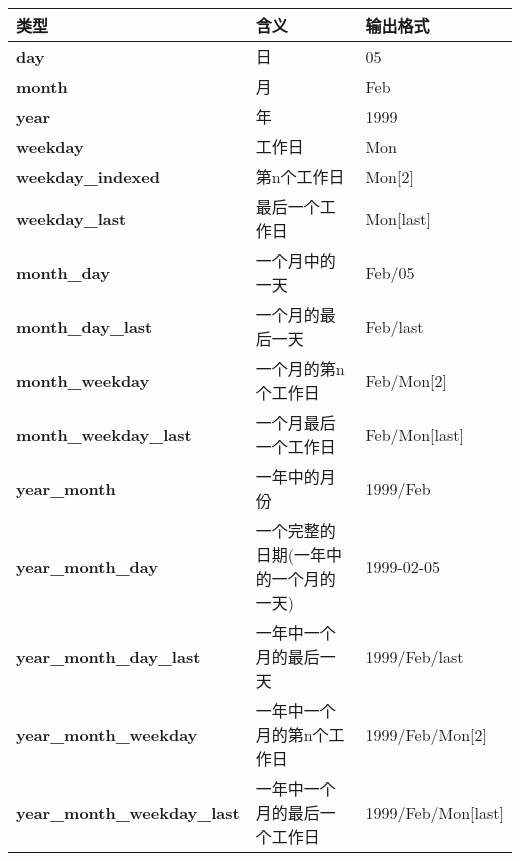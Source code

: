 \begin{longtable}[c]{|l|l|l|}
\hline
\textbf{类型}                   & \textbf{含义}                       & \textbf{输出格式} \\ \hline
\endfirsthead
%
\endhead
%
\textbf{day}                    & 日                                    & 05                     \\ \hline
\textbf{month}                  & 月                                  & Feb                    \\ \hline
\textbf{year}                   & 年                                   & 1999                   \\ \hline
\textbf{weekday}                & 工作日                                & Mon                    \\ \hline
\textbf{weekday\_indexed}       & 第n个工作日                            & Mon{[}2{]}             \\ \hline
\textbf{weekday\_last}          & 最后一个工作日                         & Mon{[}last{]}          \\ \hline
\textbf{month\_day}             & 一个月中的一天                         & Feb/05                 \\ \hline
\textbf{month\_day\_last}       & 一个月的最后一天                    & Feb/last               \\ \hline
\textbf{month\_weekday}         & 一个月的第n个工作日                 & Feb/Mon{[}2{]}         \\ \hline
\textbf{month\_weekday\_last}   & 一个月最后一个工作日                & Feb/Mon{[}last{]}      \\ \hline
\textbf{year\_month}            & 一年中的月份                        & 1999/Feb               \\ \hline
\textbf{year\_month\_day}       & 一个完整的日期(一年中的一个月的一天) & 1999-02-05             \\ \hline
\textbf{year\_month\_day\_last} & 一年中一个月的最后一天          & 1999/Feb/last          \\ \hline
\textbf{year\_month\_weekday}       & 一年中一个月的第n个工作日  & 1999/Feb/Mon{[}2{]}    \\ \hline
\textbf{year\_month\_weekday\_last} & 一年中一个月的最后一个工作日 & 1999/Feb/Mon{[}last{]} \\ \hline
\end{longtable}

